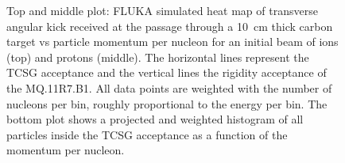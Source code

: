 \begin{figure}[htbp]
  \centering
  \caption{Top and middle plot: FLUKA simulated heat map of transverse angular kick received at the passage through a 10~cm thick carbon target vs particle momentum per nucleon for an initial beam of \lead ions (top) and protons (middle). The horizontal lines represent the TCSG acceptance and the vertical lines the rigidity acceptance of the MQ.11R7.B1. All data points are weighted with the number of nucleons per bin, roughly proportional to the energy per bin. The bottom plot shows a projected and weighted histogram of all particles inside the TCSG acceptance as a function of the momentum per nucleon. }  
  \label{pic:16072101} %
  \end{figure}




 
